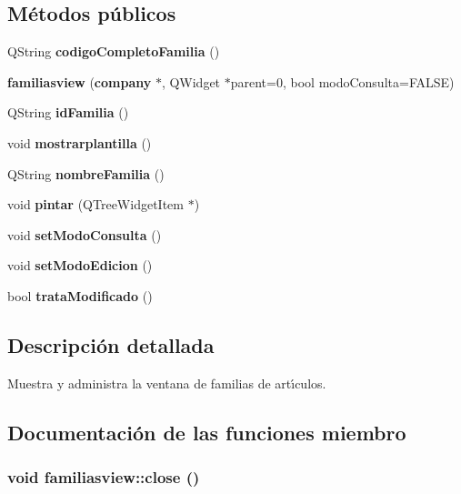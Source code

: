\subsection*{M\'{e}todos p\'{u}blicos}
\begin{CompactItemize}
\item 
QString {\bf codigo\-Completo\-Familia} ()\label{classfamiliasview_a0}

\item 
{\bf familiasview} ({\bf company} $\ast$, QWidget $\ast$parent=0, bool modo\-Consulta=FALSE)\label{classfamiliasview_a1}

\item 
QString {\bf id\-Familia} ()\label{classfamiliasview_a2}

\item 
void {\bf mostrarplantilla} ()
\item 
QString {\bf nombre\-Familia} ()\label{classfamiliasview_a4}

\item 
void {\bf pintar} (QTree\-Widget\-Item $\ast$)\label{classfamiliasview_a5}

\item 
void {\bf set\-Modo\-Consulta} ()\label{classfamiliasview_a6}

\item 
void {\bf set\-Modo\-Edicion} ()\label{classfamiliasview_a7}

\item 
bool {\bf trata\-Modificado} ()
\end{CompactItemize}


\subsection{Descripci\'{o}n detallada}
Muestra y administra la ventana de familias de art\'{\i}culos. 



\subsection{Documentaci\'{o}n de las funciones miembro}
\subsubsection{\setlength{\rightskip}{0pt plus 5cm}void familiasview::close ()\hspace{0.3cm}{\tt  [virtual, slot]}}\label{classfamiliasview_i0}


